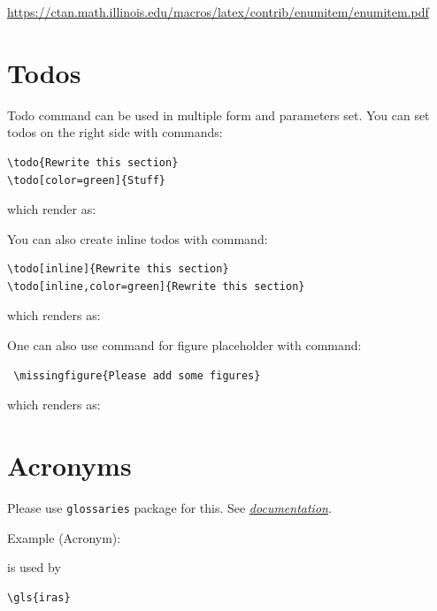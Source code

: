\url{https://ctan.math.illinois.edu/macros/latex/contrib/enumitem/enumitem.pdf}

\section{Todos}

Todo command can be used in multiple form and parameters set. You can set todos on the right side with commands:
{\small
\begin{verbatim}
\todo{Rewrite this section}
\todo[color=green]{Stuff}
\end{verbatim}
} which render as:




You can also create inline todos with command:
{\small
\begin{verbatim}
\todo[inline]{Rewrite this section}
\todo[inline,color=green]{Rewrite this section}
\end{verbatim}
} which renders as:

One can also use command for figure placeholder with command:
{\small
\begin{verbatim}
 \missingfigure{Please add some figures}
\end{verbatim}
} which renders as:


\section{Acronyms}
Please use \texttt{glossaries} package for this. See \href{https://en.wikibooks.org/wiki/LaTeX/Glossary}{\textit{documentation}}.

Example (Acronym):
{\small
\begin{spverbatim}
\end{spverbatim}
} 
is used by
{\small
\begin{verbatim}
\gls{iras}
\end{verbatim}
}


